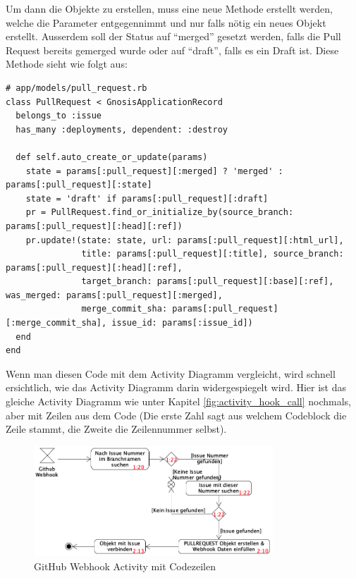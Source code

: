 Um dann die Objekte zu erstellen, muss eine neue Methode erstellt werden, welche die Parameter entgegennimmt und nur
falls nötig ein neues Objekt erstellt. Ausserdem soll der Status auf \enquote{merged} gesetzt werden, falls die Pull
Request bereits gemerged wurde oder auf \enquote{draft}, falls es ein Draft ist. Diese Methode sieht wie folgt aus:
\begin{codebox}[]
  \begin{verbatim}
# app/models/pull_request.rb
class PullRequest < GnosisApplicationRecord
  belongs_to :issue
  has_many :deployments, dependent: :destroy

  def self.auto_create_or_update(params)
    state = params[:pull_request][:merged] ? 'merged' : params[:pull_request][:state]
    state = 'draft' if params[:pull_request][:draft]
    pr = PullRequest.find_or_initialize_by(source_branch: params[:pull_request][:head][:ref])
    pr.update!(state: state, url: params[:pull_request][:html_url],
               title: params[:pull_request][:title], source_branch: params[:pull_request][:head][:ref],
               target_branch: params[:pull_request][:base][:ref], was_merged: params[:pull_request][:merged],
               merge_commit_sha: params[:pull_request][:merge_commit_sha], issue_id: params[:issue_id])
  end
end
  \end{verbatim}
\end{codebox}
Wenn man diesen Code mit dem Activity Diagramm vergleicht, wird schnell ersichtlich, wie das Activity Diagramm darin
widergespiegelt wird. Hier ist das gleiche Activity Diagramm wie unter Kapitel \ref{fig:activity_hook_call} nochmals,
aber mit Zeilen aus dem Code (Die erste Zahl sagt aus welchem Codeblock die Zeile stammt, die Zweite die Zeilennummer
selbst).
\begin{figure}[H]
  \centering
  \includegraphics[width=0.8\textwidth]{images/activity/pr_webhook_lines.png}
  \caption[Activity Diagramm zu GitHub Pull Requests Webhook Daten mit Codezeilen]{GitHub Webhook Activity mit Codezeilen}
  \label{fig:activity_diagram_pr_webhook_lines}
\end{figure}

